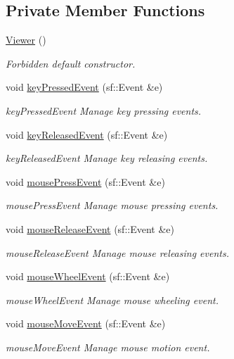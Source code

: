 \subsection*{Private Member Functions}
\begin{DoxyCompactItemize}
\item 
\hyperlink{classViewer_aaedebacb31cba87de6e7d448ed8d6586}{Viewer} ()
\begin{DoxyCompactList}\small\item\em Forbidden default constructor. \end{DoxyCompactList}\item 
void \hyperlink{classViewer_a330516bb126f9e2ac8252cb7960931cf}{key\+Pressed\+Event} (sf\+::\+Event \&e)
\begin{DoxyCompactList}\small\item\em key\+Pressed\+Event Manage key pressing events. \end{DoxyCompactList}\item 
void \hyperlink{classViewer_a5708b6929060f2c9cf4b36aaffc2565b}{key\+Released\+Event} (sf\+::\+Event \&e)
\begin{DoxyCompactList}\small\item\em key\+Released\+Event Manage key releasing events. \end{DoxyCompactList}\item 
void \hyperlink{classViewer_a5c3b224f4caef8deddfd1fac8791d64e}{mouse\+Press\+Event} (sf\+::\+Event \&e)
\begin{DoxyCompactList}\small\item\em mouse\+Press\+Event Manage mouse pressing events. \end{DoxyCompactList}\item 
void \hyperlink{classViewer_ac3dea2781388d468f883e637304925f0}{mouse\+Release\+Event} (sf\+::\+Event \&e)
\begin{DoxyCompactList}\small\item\em mouse\+Release\+Event Manage mouse releasing events. \end{DoxyCompactList}\item 
void \hyperlink{classViewer_ad40959a2f2d50bdb4cf3bc379d9c3ac0}{mouse\+Wheel\+Event} (sf\+::\+Event \&e)
\begin{DoxyCompactList}\small\item\em mouse\+Wheel\+Event Manage mouse wheeling event. \end{DoxyCompactList}\item 
void \hyperlink{classViewer_a2a097429d1bc517bdfdcb6cbda323719}{mouse\+Move\+Event} (sf\+::\+Event \&e)
\begin{DoxyCompactList}\small\item\em mouse\+Move\+Event Manage mouse motion event. \end{DoxyCompactList}\end{DoxyCompactItemize}
